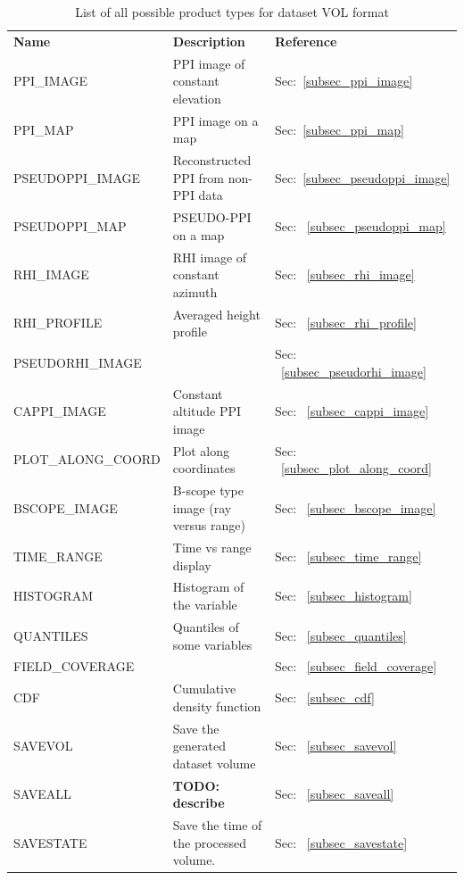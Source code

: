 \documentclass[a4paper,11pt,pdftex,twoside]{scrartcl}
\renewcommand{\bf}{\normalfont \bfseries}
\begin{document}
{{{\begin{table}[H]
\begin{tabularx}{\textwidth}{lXl}
{\bf Name}      & {\bf Description}                      & {\bf Reference} \\
PPI\_IMAGE      & PPI image of constant elevation        &  {Sec:~\ref{subsec_ppi_image}} \\
PPI\_MAP        & PPI image on a map                     &  {Sec:~\ref{subsec_ppi_map}}    \\
PSEUDOPPI\_IMAGE  & Reconstructed PPI from non-PPI data  &  {Sec:~\ref{subsec_pseudoppi_image}}   \\
PSEUDOPPI\_MAP  & PSEUDO-PPI on a map                 &  {Sec: ~\ref{subsec_pseudoppi_map}} \\
RHI\_IMAGE      & RHI image of constant azimuth          & Sec: ~\ref{subsec_rhi_image}   \\
RHI\_PROFILE    & Averaged height profile                & Sec: ~\ref{subsec_rhi_profile} \\
PSEUDORHI\_IMAGE   &                 & Sec: ~\ref{subsec_pseudorhi_image}    \\
CAPPI\_IMAGE        & Constant altitude PPI image            &  Sec: ~\ref{subsec_cappi_image}   \\
PLOT\_ALONG\_COORD & Plot along coordinates                 & Sec: ~\ref{subsec_plot_along_coord}  \\
BSCOPE\_IMAGE & B-scope type image (ray versus range)    &  Sec: ~\ref{subsec_bscope_image} \\
TIME\_RANGE & Time vs range display                 &  Sec: ~\ref{subsec_time_range}  \\
HISTOGRAM & Histogram of the variable               &  Sec: ~\ref{subsec_histogram}  \\
QUANTILES & Quantiles of some variables               & Sec: ~\ref{subsec_quantiles}  \\
FIELD\_COVERAGE &                & Sec: ~\ref{subsec_field_coverage}  \\
CDF & Cumulative density function  & Sec: ~\ref{subsec_cdf}  \\
SAVEVOL         & Save the generated dataset volume        & Sec: ~\ref{subsec_savevol}  \\
SAVEALL & {\bf TODO: describe}                 & Sec: ~\ref{subsec_saveall}  \\
SAVESTATE       & Save the time of the processed volume. & Sec: ~\ref{subsec_savestate} \\
\end{tabularx}
\caption{List of all possible product types for dataset VOL format}
\label{tab_products_VOL}
\end{table}


}}}
\end{document}
